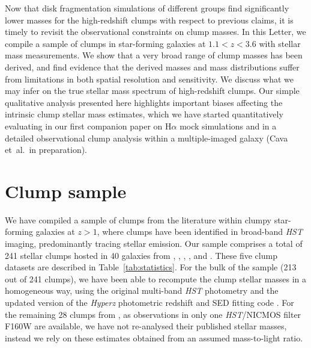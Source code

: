 \documentclass[twocolumn]{aastex61}
\begin{document}
Now that disk fragmentation simulations of different groups 
find significantly lower masses for the high-redshift clumps with respect to 
previous claims,
it is timely to revisit the observational constraints on clump masses. In this 
Letter, we compile a sample of clumps in star-forming galaxies at $1.1<z<3.6$ 
with stellar mass measurements. 
We show that a very broad range of clump masses has been derived, and find 
evidence that the derived masses and mass distributions suffer from 
limitations in both spatial resolution and sensitivity. 
We discuss what we may infer on the true stellar mass spectrum of high-redshift 
clumps. Our simple qualitative analysis presented here highlights important 
biases affecting the intrinsic clump stellar mass estimates, which we have 
started quantitatively evaluating in our first companion paper on H$\alpha$ mock 
simulations \citep[][hereafter T16]{tamburello16} and in a detailed 
observational clump analysis within a multiple-imaged galaxy (Cava et~al.\ in 
preparation).

%

\section{Clump sample}
\label{sect:samples}

We have compiled a sample of clumps from the literature within clumpy 
star-forming galaxies at $z>1$, where clumps have been identified in broad-band 
{\it HST} imaging, predominantly tracing stellar emission. Our sample comprises 
a total of 241 stellar clumps hosted in 40 galaxies from \citet{forster11}, 
\citet{guo12}, \citet{adamo13}, \citet{elmegreen13}, and \citet{wuyts14}. 
These five clump datasets are described in Table~\ref{tab:statistics}. For the 
bulk of the sample (213 out of 241 clumps), 
we have been able to recompute the clump stellar masses in a homogeneous way, 
using the original multi-band {\it HST} photometry and the updated version of 
the {\it Hyperz} photometric redshift and SED fitting code \citep{schaerer10}. 
For the remaining 28 clumps from \citet{forster11}, as observations in only one 
{\it HST}/NICMOS filter F160W are available, we have not re-analysed their 
published stellar masses, instead we rely on these estimates obtained from an 
assumed mass-to-light ratio.
\end{document}
